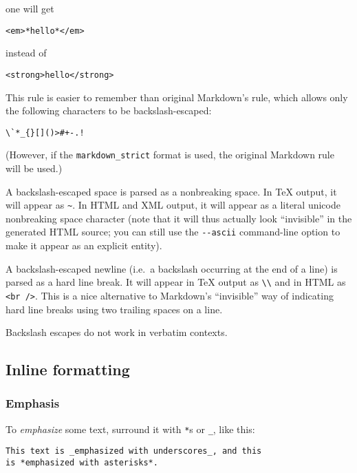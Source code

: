 one will get

\begin{verbatim}
<em>*hello*</em>
\end{verbatim}

instead of

\begin{verbatim}
<strong>hello</strong>
\end{verbatim}

This rule is easier to remember than original Markdown's rule, which
allows only the following characters to be backslash-escaped:

\begin{verbatim}
\`*_{}[]()>#+-.!
\end{verbatim}

(However, if the \texttt{markdown\_strict} format is used, the original
Markdown rule will be used.)

A backslash-escaped space is parsed as a nonbreaking space. In TeX
output, it will appear as \texttt{\textasciitilde{}}. In HTML and XML
output, it will appear as a literal unicode nonbreaking space character
(note that it will thus actually look ``invisible'' in the generated
HTML source; you can still use the \texttt{-\/-ascii} command-line
option to make it appear as an explicit entity).

A backslash-escaped newline (i.e.~a backslash occurring at the end of a
line) is parsed as a hard line break. It will appear in TeX output as
\texttt{\textbackslash{}\textbackslash{}} and in HTML as
\texttt{\textless{}br\ /\textgreater{}}. This is a nice alternative to
Markdown's ``invisible'' way of indicating hard line breaks using two
trailing spaces on a line.

Backslash escapes do not work in verbatim contexts.

\hypertarget{inline-formatting}{%
\subsection{Inline formatting}\label{inline-formatting}}

\hypertarget{emphasis}{%
\subsubsection{Emphasis}\label{emphasis}}

To \emph{emphasize} some text, surround it with \texttt{*}s or
\texttt{\_}, like this:

\begin{verbatim}
This text is _emphasized with underscores_, and this
is *emphasized with asterisks*.
\end{verbatim}

